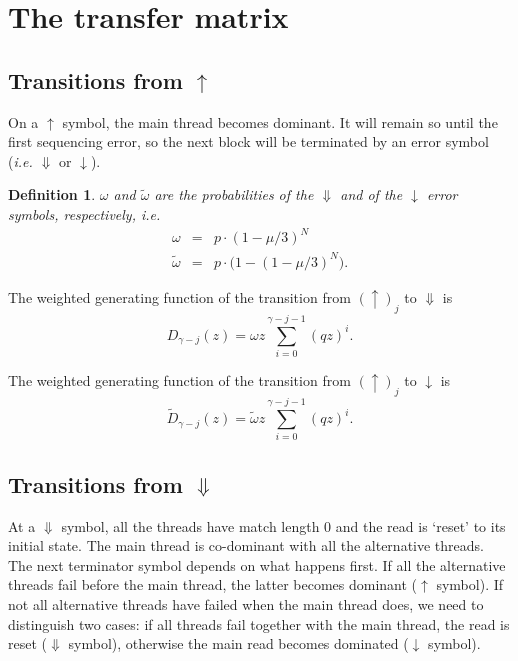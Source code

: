 \documentclass{article}
\newtheorem{definition}{Definition}
\begin{document}



\section{The transfer matrix}

\subsection{Transitions from $\uparrow$}
\label{sec:trans_from_up}

On a $\uparrow$ symbol, the main thread becomes dominant. It will remain
so until the first sequencing error, so the next block will be terminated
by an error symbol (\textit{i.e.} $\Downarrow$ or $\downarrow$).

\begin{definition}
$\omega$ and $\tilde{\omega}$ are the probabilities of the $\Downarrow$
and of the $\downarrow$ error symbols, respectively, \textit{i.e.}
\begin{eqnarray}
\omega &=& p \cdot (1-\mu/3)^N \\
\tilde{\omega} &=& p \cdot \big( 1-(1-\mu/3)^N \big).
\end{eqnarray}
\end{definition}

The weighted generating function of the transition from $(\uparrow)_j$ to
$\Downarrow$ is
\begin{equation}
D_{\gamma-j}(z) = \omega z \sum_{i=0}^{\gamma-j-1} (qz)^i.
\end{equation}

The weighted generating function of the transition from
$(\uparrow)_j$ to $\downarrow$ is
\begin{equation}
\tilde{D}_{\gamma-j}(z) = \tilde{\omega} z
  \sum_{i=0}^{\gamma-j-1} (qz)^i.
\end{equation}


\subsection{Transitions from $\Downarrow$}
\label{sec:trans_from_Down}

At a $\Downarrow$ symbol, all the threads have match length $0$ and the
read is `reset' to its initial state. The main thread is co-dominant with
all the alternative threads. The next terminator symbol depends on what
happens first. If all the alternative threads fail before the main thread,
the latter becomes dominant ($\uparrow$ symbol). If not all alternative
threads have failed when the main thread does, we need to distinguish two
cases: if all threads fail together with the main thread, the read is
reset ($\Downarrow$ symbol), otherwise the main read becomes dominated
($\downarrow$ symbol).
\end{document}
